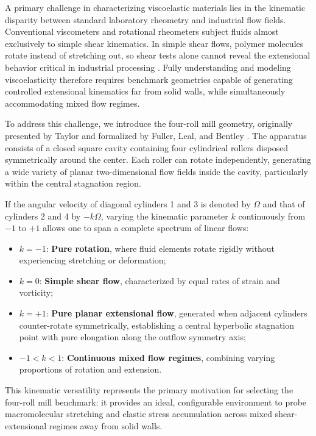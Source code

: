 A primary challenge in characterizing viscoelastic materials lies in the kinematic
disparity between standard laboratory rheometry and industrial flow fields.
Conventional viscometers and rotational rheometers subject fluids almost
exclusively to simple shear kinematics. In simple shear flows, polymer molecules
rotate instead of stretching out, so shear tests alone cannot reveal the
extensional behavior critical in industrial processing \cite{bird1987dynamics}.
Fully understanding and modeling viscoelasticity therefore requires benchmark
geometries capable of generating controlled extensional kinematics far from solid
walls, while simultaneously accommodating mixed flow regimes.

To address this challenge, we introduce the four-roll mill geometry, originally
presented by Taylor \cite{taylor1934formation} and formalized by
Fuller, Leal, and Bentley \cite{fuller1980flow, fuller1981flow, bentley1986experimental}.
The apparatus consists of a closed square cavity containing four cylindrical rollers
disposed symmetrically around the center. Each roller can rotate independently,
generating a wide variety of planar two-dimensional flow fields inside the cavity,
particularly within the central stagnation region.

If the angular velocity of diagonal cylinders 1 and 3 is denoted by $\Omega$ and
that of cylinders 2 and 4 by $-k\Omega$, varying the kinematic parameter $k$
continuously from $-1$ to $+1$ allows one to span a complete spectrum of linear
flows:
\begin{itemize}
    \item $k = -1$: \textbf{Pure rotation}, where fluid elements rotate
    rigidly without experiencing stretching or deformation;
    \item $k = 0$: \textbf{Simple shear flow}, characterized by equal rates of
    strain and vorticity;
    \item $k = +1$: \textbf{Pure planar extensional flow}, generated when adjacent
    cylinders counter-rotate symmetrically, establishing a central hyperbolic
    stagnation point with pure elongation along the outflow symmetry axis;
    \item $-1 < k < 1$: \textbf{Continuous mixed flow regimes}, combining varying
    proportions of rotation and extension.
\end{itemize}
This kinematic versatility represents the primary motivation for selecting the
four-roll mill benchmark: it provides an ideal, configurable environment to probe
macromolecular stretching and elastic stress accumulation across
mixed shear-extensional regimes away from solid walls.

